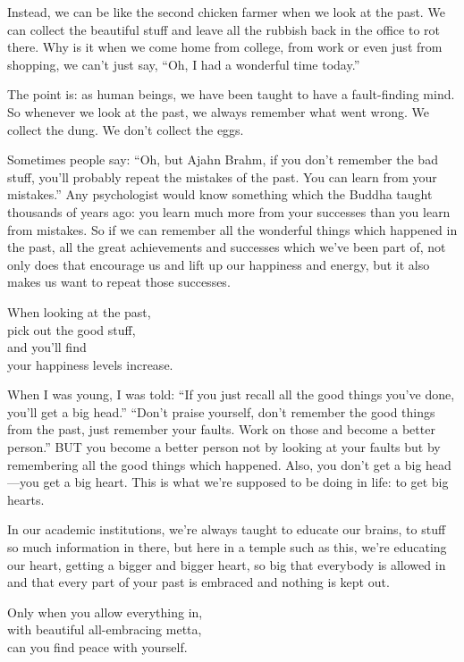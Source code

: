 \documentclass[12pt, openany]{book}
\newenvironment{aphorism}%
{%
\begin{center}\begin{itshape}
}%
{\end{itshape}\end{center}
}%
\begin{document}
Instead, we can be like the second chicken farmer when we look at the past. We can collect the beautiful stuff and leave all the rubbish back in the office to rot there. Why is it when we come home from college, from work or even just from shopping, we can’t just say, “Oh, I had a wonderful time today.” 

The point is: as human beings, we have been taught to have a fault-finding mind. So whenever we look at the past, we always remember what went wrong. We collect the dung. We don’t collect the eggs. 

Sometimes people say: “Oh, but Ajahn Brahm, if you don’t remember the bad stuff, you’ll probably repeat the mistakes of the past. You can learn from your mistakes.” Any psychologist would know something which the Buddha taught thousands of years ago: you learn much more from your successes than you learn from mistakes. So if we can remember all the wonderful things which happened in the past, all the great achievements and successes which we’ve been part of, not only does that encourage us and lift up our happiness and energy, but it also makes us want to repeat those successes. 

\begin{aphorism}
When looking at the past,\\  
pick out the good stuff,\\  
and you’ll find\\ 
your happiness levels increase.
\end{aphorism}

When I was young, I was told: “If you just recall all the good things you’ve done, you’ll get a big head.” “Don’t praise yourself, don’t remember the good things from the past, just remember your faults. Work on those and become a better person.” BUT you become a better person not by looking at your faults but by remembering all the good things which happened. Also, you don’t get a big head—you get a big heart. This is what we’re supposed to be doing in life: to get big hearts. 

In our academic institutions, we’re always taught to educate our brains, to stuff so much information in there, but here in a temple such as this, we’re educating our heart, getting a bigger and bigger heart, so big that everybody is allowed in and that every part of your past is embraced and nothing is kept out. 

\begin{aphorism}
Only when you allow everything in,\\  
with beautiful all-embracing metta,\\ 
can you find peace with yourself.
\end{aphorism}
\end{document}
